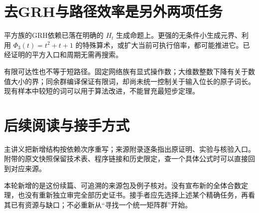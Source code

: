 \section{去GRH与路径效率是另外两项任务}
平方族的GRH依赖已落在明确的 $H_t$ 生成命题上。更强的无条件小生成元界、利用 $\Phi_3(t)=t^2+t+1$ 的特殊算术，或扩大当前可执行倍率，都可能推进它。已经证明的平方入口和周期无需再搜索。

有限可达性也不等于短路径。固定网络族有显式操作数；大维数整数下降有关于数值大小的界；同余群编译保证有限词，却尚未统一控制关于输入位长的原子词长。现有样本中较短的词可以用于算法改进，不能冒充最短步定理。

\section{后续阅读与接手方式}
主讲义把新增结构按依赖次序重写；来源附录逐条指出原证明、实验与核验入口。附带的原文快照保留技术表、程序链接和历史限定，查一个具体公式时可以直接回到对应来源。

本轮新增的是这份续篇、可追溯的来源包及例子核对。没有宣布新的全体合数定理，也没有重新独立审完全部历史证书。接手者应先选择上述某个精确任务，再看其已有资源与缺口；不必重新从“寻找一个统一矩阵群”开始。
